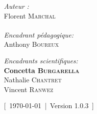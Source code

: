 \documentclass[../main]{subfiles} %
\begin{document}
\begin{titlepage}
\begin{center}
\noindent
\begin{minipage}{0.4\textwidth}
  \begin{flushleft} \large
    \emph{Auteur :}\\
    Florent \textsc{Marchal} \\
     \\
    \emph{Encadrant pédagogique:} \\
    Anthony \textsc{Boureux}\\
    
  \end{flushleft}
\end{minipage}
\begin{minipage}{0.5\textwidth}
  \begin{flushright} \large
    

    \emph{Encadrants scientifiques:} \\
    \textbf{Concetta \textsc{Burgarella}} \\
    Nathalie \textsc{Chantret} \\
    Vincent \textsc{Ranwez}
      \\
    

  \end{flushright}
\end{minipage}

\vfill

{\large [ \today  | Version 1.0.3 ]}

\end{center}
\end{titlepage}


\end{document}
